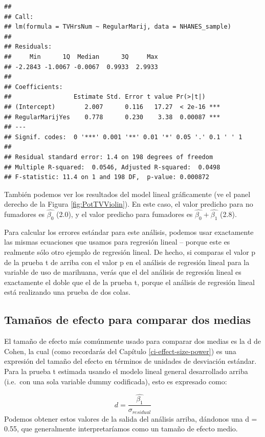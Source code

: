 \documentclass[
  12pt,
]{book}
\begin{document}
\begin{verbatim}
## 
## Call:
## lm(formula = TVHrsNum ~ RegularMarij, data = NHANES_sample)
## 
## Residuals:
##     Min      1Q  Median      3Q     Max 
## -2.2843 -1.0067 -0.0067  0.9933  2.9933 
## 
## Coefficients:
##                 Estimate Std. Error t value Pr(>|t|)    
## (Intercept)        2.007      0.116   17.27  < 2e-16 ***
## RegularMarijYes    0.778      0.230    3.38  0.00087 ***
## ---
## Signif. codes:  0 '***' 0.001 '**' 0.01 '*' 0.05 '.' 0.1 ' ' 1
## 
## Residual standard error: 1.4 on 198 degrees of freedom
## Multiple R-squared:  0.0546,	Adjusted R-squared:  0.0498 
## F-statistic: 11.4 on 1 and 198 DF,  p-value: 0.000872
\end{verbatim}

También podemos ver los resultados del model lineal gráficamente (ve el panel derecho de la Figura \ref{fig:PotTVViolin}). En este caso, el valor predicho para no fumadores es \(\hat{\beta_0}\) (2.0), y el valor predicho para fumadores es \(\hat{\beta_0} +\hat{\beta_1}\) (2.8).

Para calcular los errores estándar para este análisis, podemos usar exactamente las mismas ecuaciones que usamos para regresión lineal -- porque este es realmente sólo otro ejemplo de regresión lineal. De hecho, si comparas el valor p de la prueba t de arriba con el valor p en el análisis de regresión lineal para la variable de uso de marihuana, verás que el del análisis de regresión lineal es exactamente el doble que el de la prueba t, porque el análisis de regresión lineal está realizando una prueba de dos colas.

\hypertarget{tamauxf1os-de-efecto-para-comparar-dos-medias}{%
\subsection{Tamaños de efecto para comparar dos medias}\label{tamauxf1os-de-efecto-para-comparar-dos-medias}}

El tamaño de efecto más comúnmente usado para comparar dos medias es la d de Cohen, la cual (como recordarás del Capítulo \ref{ci-effect-size-power}) es una expresión del tamaño del efecto en términos de unidades de desviación estándar. Para la prueba t estimada usando el modelo lineal general desarrollado arriba (i.e.~con una sola variable dummy codificada), esto es expresado como:

\[
d = \frac{\hat{\beta_1}}{\sigma_{residual}}
\]
Podemos obtener estos valores de la salida del análisis arriba, dándonos una d = 0.55, que generalmente interpretaríamos como un tamaño de efecto medio.
\end{document}
